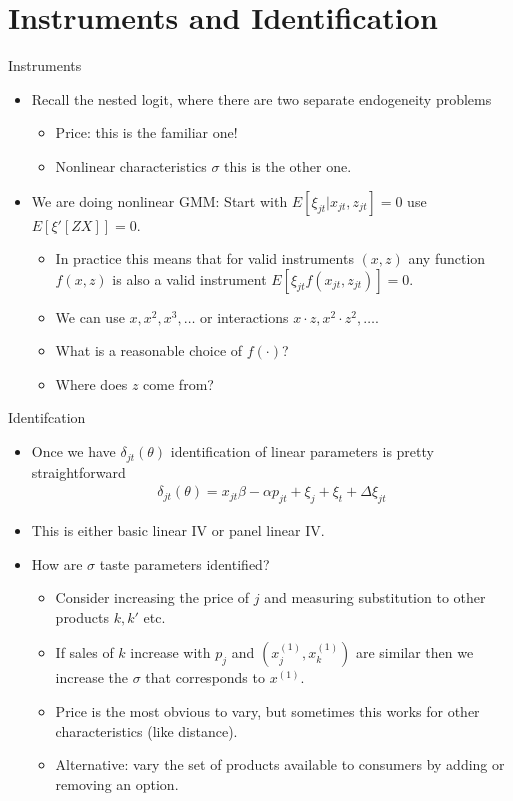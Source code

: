 \documentclass[xcolor=pdftex,dvipsnames,table,mathserif]{beamer}
\begin{document}
\section{Instruments and Identification}

\begin{frame}{Instruments}
\begin{itemize}
\item Recall the nested logit, where there are two separate endogeneity problems
\begin{itemize}
\item \alert{Price}: this is the familiar one!
\item \alert{Nonlinear characteristics} $\sigma$ this is the other one.
\end{itemize}
\item We are doing nonlinear GMM: Start with $E[\xi_{jt} | x_{jt}, z_{jt}]=0$ use $E[\xi' [Z X]]=0$.
\begin{itemize}
\item In practice this means that for valid instruments $(x,z)$ any function $f(x,z)$ is also a valid instrument $E[ \xi_{jt} f(x_{jt},z_{jt})]=0$.
\item We can use $x, x^2, x^3,\ldots$ or interactions $x \cdot z, x^2 \cdot z^2, \ldots$.
\item What is a reasonable choice of $f(\cdot)$?
\item Where does $z$ come from?
\end{itemize}
\end{itemize}
\end{frame}

\begin{frame}{Identifcation}
\begin{itemize}
\item Once we have $\delta_{jt}(\theta)$ identification of linear parameters is pretty straightforward
\begin{eqnarray*}
\delta_{jt}(\theta) = x_{jt} \beta - \alpha p_{jt} + \xi_j + \xi_t + \Delta \xi_{jt}
\end{eqnarray*}
\item This is either basic linear IV or panel linear IV.
\item How are $\sigma$ taste parameters identified?
\begin{itemize}
\item Consider increasing the price of $j$ and measuring substitution to other products $k,k'$ etc.
\item If sales of $k$ increase with $p_j$ and $(x_j^{(1)},x_k^{(1)})$ are similar then we increase the $\sigma$ that corresponds to $x^{(1)}$.
\item Price is the most obvious to vary, but sometimes this works for other characteristics (like distance).
\item Alternative: vary the set of products available to consumers by adding or removing an option.
\end{itemize}
\end{itemize}
\end{frame}
\end{document}

